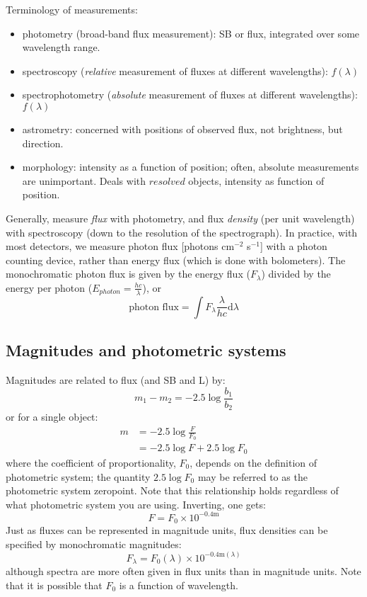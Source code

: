 \documentclass[12pt]{article}
\begin{document}
Terminology of measurements:
\begin{itemize}
    \item photometry (broad-band flux measurement): SB or flux, integrated
        over some wavelength range.
    \item spectroscopy (\emph{relative} measurement of fluxes at
        different wavelengths):
        $f(\lambda)$
    \item spectrophotometry (\emph{absolute} measurement of fluxes at
        different wavelengths):
        $f(\lambda)$
    \item astrometry: concerned with positions of observed flux, not brightness,
        but direction.
    \item morphology: intensity as a function of position;
        often, absolute measurements are unimportant. Deals with $resolved$
        objects, intensity as function of position.
\end{itemize}
Generally, measure \emph{flux} with photometry, and flux
\emph{density} (per unit wavelength)  with spectroscopy
(down to the resolution of the spectrograph).
In practice, with most detectors,
we measure photon flux [photons cm$^{-2}$ s$^{-1}$]
with a photon counting device,
rather than energy flux (which is done with bolometers).
The monochromatic photon flux is given by the
energy flux ($F_{\lambda}$)
divided by the
energy per photon ($E_{photon} = \frac{hc}{\lambda}$), or
$$ \textrm{photon\ flux} = \int F_{\lambda}
    \frac{\lambda}{hc} \textrm{d} \lambda $$


\subsection*{Magnitudes and photometric systems}
Magnitudes are related to flux (and SB and L) by:
    $$    m_1 - m_2 = -2.5 \log \frac{b_1}{b_2} $$
or for a single object:
\begin{align*}
    m &= -2.5 \log \frac{F}{F_0}\\
      &= -2.5 \log F + 2.5 \log F_0
\end{align*}
where the coefficient of proportionality, $F_0$, depends on the definition
of photometric system; the quantity $2.5 \log F_0$ may be referred to as
the photometric system zeropoint. Note that this relationship holds
regardless of what photometric system you are using. Inverting, one gets:
    $$ F = F_0 \times 10^{-0.4\textrm{m}} $$
Just as fluxes can be represented in magnitude units, flux densities can be
specified by monochromatic magnitudes:
\begin{equation*}
    F_{\lambda} = F_0 (\lambda) \times 10^{-0.4 \textrm{m}(\lambda)}
\end{equation*}
although spectra are more often given in flux units than in magnitude units.
Note that it is possible that $F_0$ is a function of wavelength.
\end{document}
